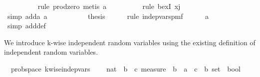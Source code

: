 \begin{isabellebody}
\ \ \ \ \ \ \ \ \isamarkupfalse%
\ {\isacharparenleft}{\kern0pt}rule\ prod{\isacharunderscore}{\kern0pt}zero{\isacharcomma}{\kern0pt}\ metis\ a{\isacharunderscore}{\kern0pt}{}{}{\isacharparenright}{\kern0pt}\isanewline
\ \ \ \ \ \ \ \ \isamarkupfalse%
\ {\isacharparenleft}{\kern0pt}rule\ bexI{\isacharbrackleft}{\kern0pt}\ x{\isacharequal}{\kern0pt}{\isachardoublequoteopen}j{\isachardoublequoteclose}{\isacharbrackright}{\kern0pt}{\isacharparenright}{\kern0pt}\isanewline
\ \ \ \ \ \ \ \ \isamarkupfalse%
\ {\isacharparenleft}{\kern0pt}simp\ add{\isacharcolon}{\kern0pt}a{\isacharunderscore}{\kern0pt}{}{}\ a{\isacharunderscore}{\kern0pt}{}{\isacharparenright}{\kern0pt}{\isacharplus}{\kern0pt}\isanewline
\ \ \ \ \isamarkupfalse%
\isanewline
\ \ \isamarkupfalse%
\isanewline
\ \ \isamarkupfalse%
\ {\isacharquery}{\kern0pt}thesis\isanewline
\ \ \ \ \isamarkupfalse%
\ {\isacharparenleft}{\kern0pt}rule\ indep{\isacharunderscore}{\kern0pt}vars{\isacharunderscore}{\kern0pt}pmf{\isacharparenright}{\kern0pt}\isanewline
\ \ \ \ \isamarkupfalse%
\ a\ \isamarkupfalse%
\ {\isacharparenleft}{\kern0pt}simp\ add{\isacharcolon}{\kern0pt}{\isasymOmega}{\isacharunderscore}{\kern0pt}def{\isacharparenright}{\kern0pt}\isanewline
{}\isamarkupfalse%
%
\endisatagproof
{\isafoldproof}%
%
\isadelimproof
%
\endisadelimproof
%
\begin{isamarkuptext}%
We introduce k-wise independent random variables using the existing definition of
independent random variables.%
\end{isamarkuptext}\isamarkuptrue%
\isamarkupfalse%
\ {\isacharparenleft}{\kern0pt}\ prob{\isacharunderscore}{\kern0pt}space{\isacharparenright}{\kern0pt}\ k{\isacharunderscore}{\kern0pt}wise{\isacharunderscore}{\kern0pt}indep{\isacharunderscore}{\kern0pt}vars\ {\isacharcolon}{\kern0pt}{\isacharcolon}{\kern0pt}\ \isanewline
\ \ {\isachardoublequoteopen}nat\ {\isasymRightarrow}\ {\isacharparenleft}{\kern0pt}{\isacharprime}{\kern0pt}b\ {\isasymRightarrow}\ {\isacharprime}{\kern0pt}c\ measure{\isacharparenright}{\kern0pt}\ {\isasymRightarrow}\ {\isacharparenleft}{\kern0pt}{\isacharprime}{\kern0pt}b\ {\isasymRightarrow}\ {\isacharprime}{\kern0pt}a\ {\isasymRightarrow}\ {\isacharprime}{\kern0pt}c{\isacharparenright}{\kern0pt}\ {\isasymRightarrow}\ {\isacharprime}{\kern0pt}b\ set\ {\isasymRightarrow}\ bool{\isachardoublequoteclose}\ \isanewline

\end{isabellebody}
